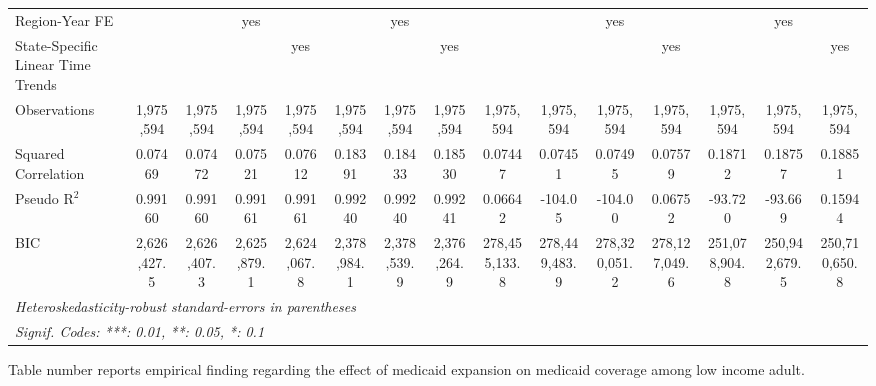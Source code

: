 \documentclass[
]{article}
\begin{document}
\begin{landscape}
\begin{table}[htbp]
\begin{adjustbox}{width = 1.5\textwidth, center}
\begin{threeparttable}[b]
\begin{tabular}{lcccccccccccccc}
            Region-Year FE                            &                &                & yes            &                &                & yes            &                &                &                & yes            &                &               & yes           & \\  
            State-Specific Linear Time Trends         &                &                &                & yes            &                &                & yes            &                &                &                & yes            &               &               & yes\\  
            \midrule 
            Observations                              & 1,975,594      & 1,975,594      & 1,975,594      & 1,975,594      & 1,975,594      & 1,975,594      & 1,975,594      & 1,975,594      & 1,975,594      & 1,975,594      & 1,975,594      & 1,975,594     & 1,975,594     & 1,975,594\\  
            Squared Correlation                       & 0.07469        & 0.07472        & 0.07521        & 0.07612        & 0.18391        & 0.18433        & 0.18530        & 0.07447        & 0.07451        & 0.07495        & 0.07579        & 0.18712       & 0.18757       & 0.18851\\  
            Pseudo R$^2$                              & 0.99160        & 0.99160        & 0.99161        & 0.99161        & 0.99240        & 0.99240        & 0.99241        & 0.06642        & -104.05        & -104.00        & 0.06752        & -93.720       & -93.669       & 0.15944\\  
            BIC                                       & 2,626,427.5    & 2,626,407.3    & 2,625,879.1    & 2,624,067.8    & 2,378,984.1    & 2,378,539.9    & 2,376,264.9    & 278,455,133.8  & 278,449,483.9  & 278,320,051.2  & 278,127,049.6  & 251,078,904.8 & 250,942,679.5 & 250,710,650.8\\  
            \midrule \midrule
            \multicolumn{15}{l}{\emph{Heteroskedasticity-robust standard-errors in parentheses}}\\
            \multicolumn{15}{l}{\emph{Signif. Codes: ***: 0.01, **: 0.05, *: 0.1}}\\
         \end{tabular}
      \end{threeparttable}
   \end{adjustbox}
\end{table}
\end{landscape}

Table number reports empirical finding regarding the effect of medicaid
expansion on medicaid coverage among low income adult.
\end{document}

